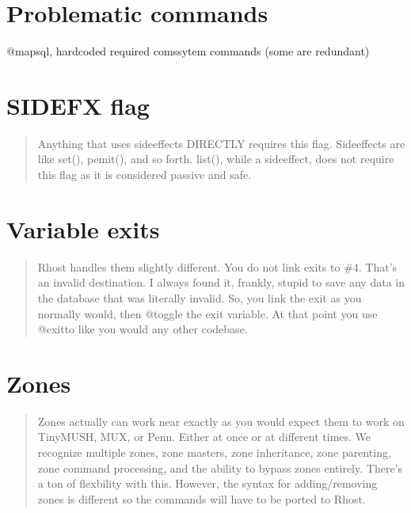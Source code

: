 \documentclass[letterpaper,10pt,english]{sphinxmanual}
\begin{document}
\section{Problematic commands}
\label{\detokenize{10-customize:problematic-commands}}
\sphinxAtStartPar
@mapsql, hardcoded required comssytem commands (some are redundant)


\section{SIDEFX flag}
\label{\detokenize{10-customize:sidefx-flag}}\begin{quote}

\sphinxAtStartPar
Anything that uses sideeffects \textendash{}DIRECTLY\textendash{} requires this flag.
Sideeffects are like set(), pemit(), and so forth.  list(), while a
side\sphinxhyphen{}effect, does not require this flag as it is considered passive and safe.
\end{quote}


\section{Variable exits}
\label{\detokenize{10-customize:variable-exits}}\begin{quote}

\sphinxAtStartPar
Rhost handles them slightly different.  You do not link
exits to \#\sphinxhyphen{}4.  That’s an invalid destination.  I always found it, frankly,
stupid to save any data in the database that was literally invalid.  So,
you link the exit as you normally would, then @toggle the exit variable.
At that point you use @exitto like you would any other codebase.
\end{quote}


\section{Zones}
\label{\detokenize{10-customize:zones}}\begin{quote}

\sphinxAtStartPar
Zones actually can work near exactly as you would expect them to
work on TinyMUSH, MUX, or Penn.  Either at once or at different times.
We recognize multiple zones, zone masters, zone inheritance, zone
parenting, zone command processing, and the ability to bypass zones
entirely.  There’s a ton of flexbility with this.  However, the syntax
for adding/removing zones is different so the commands will have to be
ported to Rhost.
\end{quote}
\end{document}

